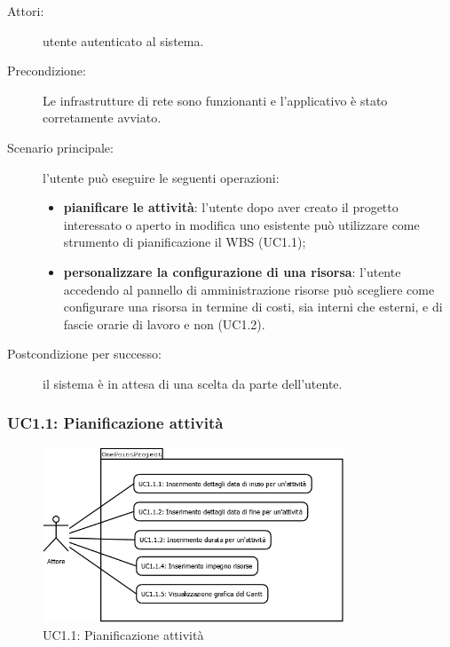 \begin{description}
\item[Attori:]{utente autenticato al sistema.}
\item[Precondizione:]{Le infrastrutture di rete sono funzionanti e l\textquoteright{}applicativo \`{e} stato corretamente avviato.}
\item[Scenario principale:]{l\textquoteright{}utente pu\`{o} eseguire le seguenti operazioni:
	\begin{itemize}
	\item \textbf{pianificare le attivit\`{a}}: l\textquoteright{}utente dopo aver creato il progetto interessato o aperto in modifica uno esistente pu\`{o} utilizzare come strumento di pianificazione il WBS (UC1.1);
	\item \textbf{personalizzare la configurazione di una risorsa}: l\textquoteright{}utente accedendo al pannello di amministrazione risorse pu\`{o} scegliere come configurare una risorsa in termine di costi, sia interni che esterni, e di fascie orarie di lavoro e non (UC1.2).
	\end{itemize}}
\item[Postcondizione per successo:]{il sistema \`{e} in attesa di una scelta da parte dell\textquoteright{}utente.}
\end{description}

\subsubsection[UC1.1: Pianificazione attivit\`{a}]{UC1.1: Pianificazione attivit\`{a}}
\begin{figure}[H]
\begin{center}
\includegraphics[width=0.80\textwidth]{img/UC/UC1.1.png}
\caption{UC1.1: Pianificazione attivit\`{a}}
\label{fig:UC1.1}
\end{center}
\end{figure}

